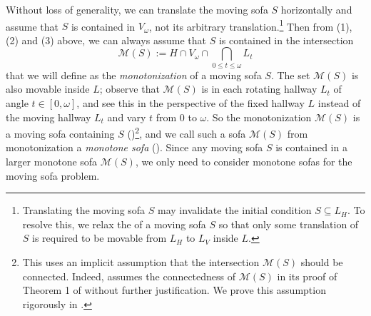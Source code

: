 Without loss of generality, we can translate the moving sofa \(S\) horizontally and assume that \(S\) is contained in \(V_\omega\), not its arbitrary translation.\footnote{Translating the moving sofa \(S\) may invalidate the initial condition \(S \subseteq L_H\). To resolve this, we relax the  of a moving sofa \(S\) so that only some translation of \(S\) is required to be movable from \(L_H\) to \(L_V\) inside \(L\).} Then from (1), (2) and (3) above, we can always assume that \(S\) is contained in the intersection
\begin{equation}
\label{eqn:monotone}
\mathcal{M}(S) := H \cap V_\omega \cap \bigcap_{0 \leq t \leq \omega} L_t
\end{equation}
that we will define as the \emph{monotonization} of a moving sofa \(S\). The set \(\mathcal{M}(S)\) is also movable inside \(L\); observe that \(\mathcal{M}(S)\) is in each rotating hallway \(L_t\) of angle \(t \in [0, \omega]\), and see this in the perspective of the fixed hallway \(L\) instead of the moving hallway \(L_t\) and vary \(t\) from \(0\) to \(\omega\). So the monotonization \(\mathcal{M}(S)\) is a moving sofa containing \(S\) ()\footnote{This uses an implicit assumption that the intersection \(\mathcal{M}(S)\) should be connected. Indeed, \autocite{gerverMovingSofaCorner1992} assumes the connectedness of \(\mathcal{M}(S)\) in its proof of Theorem 1 of \autocite{gerverMovingSofaCorner1992} without further justification. We prove this assumption rigorously in .}, and we call such a sofa \(\mathcal{M}(S)\) from monotonization a \emph{monotone sofa} (). Since any moving sofa \(S\) is contained in a larger monotone sofa \(\mathcal{M}(S)\), we only need to consider monotone sofas for the moving sofa problem.